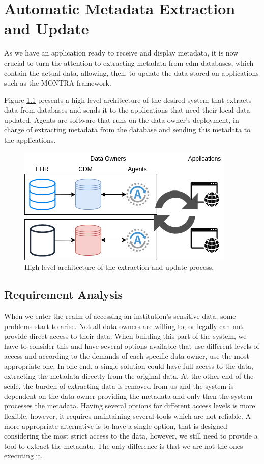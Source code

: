 \chapter{Automatic Metadata Extraction and Update}
\label{chapter:extraction-update}
\graphicspath{{figs/04-extraction-update/}}

As we have an application ready to receive and display metadata, it is now crucial to turn the attention to extracting metadata from \gls{cdm} databases, which contain the actual data, allowing, then, to update the data stored on applications such as the MONTRA framework.

Figure \ref{fig:overall-arch-v1} presents a high-level architecture of the desired system that extracts data from databases and sends it to the applications that need their local data updated.
Agents are software that runs on the data owner's deployment, in charge of extracting metadata from the database and sending this metadata to the applications.

\begin{figure}[H]
    \center
    \includegraphics[width=.6\textwidth]{overall-arch-v1}
    \caption{High-level architecture of the extraction and update process.}
    \label{fig:overall-arch-v1}
\end{figure}

\section{Requirement Analysis}

When we enter the realm of accessing an institution's sensitive data, some problems start to arise.
Not all data owners are willing to, or legally can not, provide direct access to their data.
When building this part of the system, we have to consider this and have several options available that use different levels of access and according to the demands of each specific data owner, use the most appropriate one.
In one end, a single solution could have full access to the data, extracting the metadata directly from the original data.
At the other end of the scale, the burden of extracting data is removed from us and the system is dependent on the data owner providing the metadata and only then the system processes the metadata.
Having several options for different access levels is more flexible, however, it requires maintaining several tools which are not reliable.
A more appropriate alternative is to have a single option, that is designed considering the most strict access to the data, however, we still need to provide a tool to extract the metadata.
The only difference is that we are not the ones executing it.

